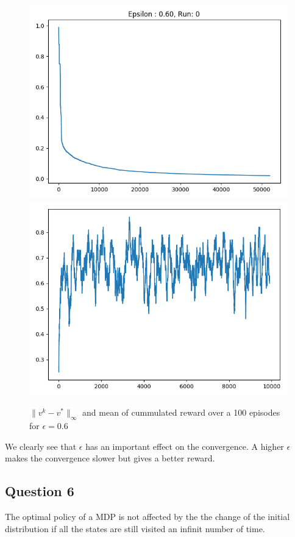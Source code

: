\documentclass[10pt,a4paper]{article}
\begin{document}
\begin{figure}
\centering
\caption{$\parallel v^k - v^* \parallel_{\infty}$ and mean of cummulated reward over a 100 episodes for $\epsilon=0.6$}
\includegraphics[scale=.35]{q5_v_6.png}
\includegraphics[scale=.35]{q5_r_6.png}
\end{figure}
\newpage
We clearly see that $\epsilon$ has an important effect on the convergence. A higher $\epsilon$ makes the convergence slower but gives a better reward.
\subsection{Question 6}
The optimal policy of a MDP is not affected by the the change of the initial distribution if all the states are still visited an infinit number of time.
\end{document}
